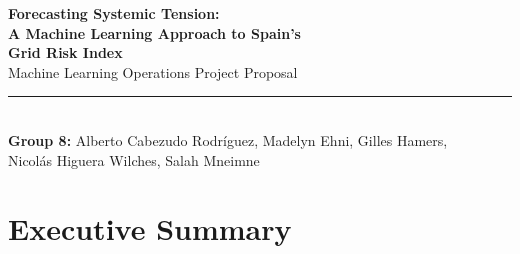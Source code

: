 \documentclass[11pt, a4paper]{article}
\begin{document}

\begin{titlepage}
\pagecolor{white}
\color{reeBlue}

\vspace*{7.5cm}
\begin{center}

  {\fontsize{22}{22}\selectfont\bfseries
    Forecasting Systemic Tension:\\[0.3cm]
    A Machine Learning Approach to Spain's\\[0.3cm]
    Grid Risk  Index}\\[0.5cm]

{\large Machine Learning Operations Project Proposal}\\[8pt]

  \textcolor{reeBlue}{\rule{1.0\linewidth}{0.3pt}}\\[0.5cm]

  {\bfseries Group 8:}
    Alberto Cabezudo Rodr\'iguez, Madelyn Ehni, Gilles Hamers,\\
    Nicol\'as Higuera Wilches, Salah Mneimne\\[2cm]
\end{center}
\end{titlepage}
\nopagecolor

\setcounter{page}{0}
\tableofcontents
\thispagestyle{empty}
\newpage

\pagestyle{fancy}
\fancyhf{}
\fancyfoot[C]{\small\color{reeBlue}\thepage}
\renewcommand{\headrulewidth}{0.3pt}
\renewcommand{\footrulewidth}{0pt}

\section{Executive Summary}
\end{document}
